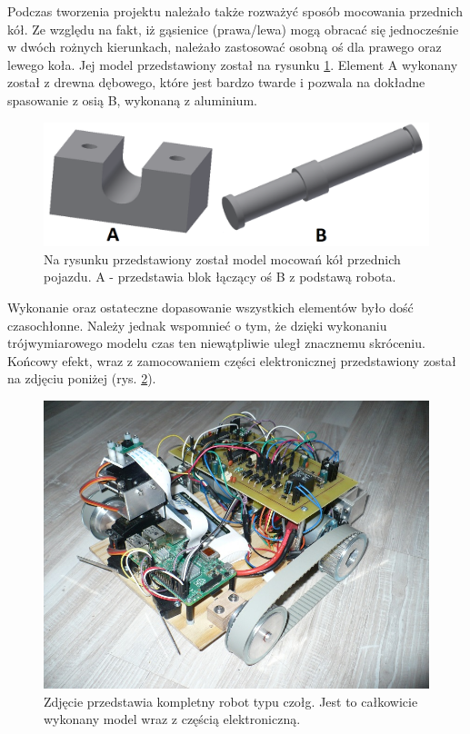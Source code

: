 Podczas tworzenia projektu należało także rozważyć sposób mocowania przednich kół. Ze względu na fakt, iż gąsienice (prawa/lewa) mogą obracać się jednocześnie w dwóch rożnych kierunkach, należało zastosować osobną oś dla prawego oraz lewego koła. Jej model przedstawiony został na rysunku \ref{zamocowanie_przod}. Element A wykonany został z drewna dębowego, które jest bardzo twarde i pozwala na dokładne spasowanie z osią B, wykonaną z aluminium.

  \begin{figure}[H]
    \begin{center}
      \includegraphics[scale=0.40]{imgs/moc_kol_prz.png}
 	\caption[Model mocowania kół przednich.]{\small{Na rysunku przedstawiony został model mocowań kół przednich pojazdu. A - przedstawia blok łączący oś B z podstawą robota.}}
	\label{zamocowanie_przod}
    \end{center}
  \end{figure}
Wykonanie oraz ostateczne dopasowanie wszystkich elementów było dość czasochłonne. Należy jednak wspomnieć o tym, że dzięki wykonaniu trójwymiarowego modelu czas ten niewątpliwie uległ znacznemu skróceniu. Końcowy efekt, wraz z zamocowaniem części elektronicznej przedstawiony został na zdjęciu poniżej (rys. \ref{czolg_calosc}).
\newpage
  \begin{figure}[H]
    \begin{center}
      \includegraphics[scale=0.65]{imgs/czolg2.jpg}
 	\caption[Zbudowany model.]{\small{Zdjęcie przedstawia kompletny robot typu czołg. Jest to całkowicie wykonany model wraz z częścią elektroniczną.}}
	\label{czolg_calosc}
    \end{center}
  \end{figure}
